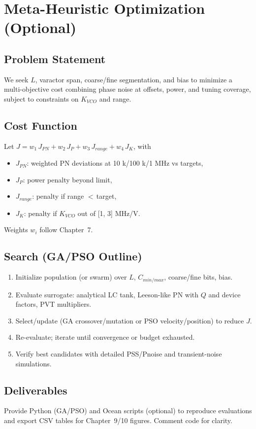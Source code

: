 \chapter{Meta-Heuristic Optimization (Optional)}
\section{Problem Statement}
We seek $L$, varactor span, coarse/fine segmentation, and bias to minimize a multi-objective cost combining phase noise at offsets, power, and tuning coverage, subject to constraints on $K_{VCO}$ and range.

\section{Cost Function}
Let $J = w_1\,J_{PN} + w_2\,J_{P} + w_3\,J_{range} + w_4\,J_{K}$, with
\begin{itemize}
  \item $J_{PN}$: weighted PN deviations at 10 k/100 k/1 MHz vs targets,
  \item $J_P$: power penalty beyond limit,
  \item $J_{range}$: penalty if range $<\,$target,
  \item $J_{K}$: penalty if $K_{VCO}$ out of [1, 3] MHz/V.
\end{itemize}
Weights $w_i$ follow Chapter~7.

\section{Search (GA/PSO Outline)}
\begin{enumerate}
  \item Initialize population (or swarm) over $L$, $C_{min/max}$, coarse/fine bits, bias.
  \item Evaluate surrogate: analytical LC tank, Leeson-like PN with $Q$ and device factors, PVT multipliers.
  \item Select/update (GA crossover/mutation or PSO velocity/position) to reduce $J$.
  \item Re-evaluate; iterate until convergence or budget exhausted.
  \item Verify best candidates with detailed PSS/Pnoise and transient-noise simulations.
\end{enumerate}

\section{Deliverables}
Provide Python (GA/PSO) and Ocean scripts (optional) to reproduce evaluations and export CSV tables for Chapter~9/10 figures. Comment code for clarity.
